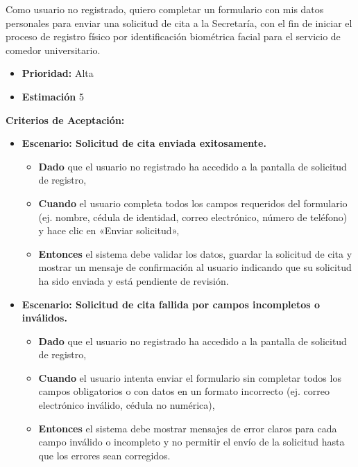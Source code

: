 \documentclass[12pt]{article}
\begin{document}
Como usuario no registrado, quiero completar un formulario con mis datos personales para enviar una solicitud de cita a la Secretaría, con el fin de iniciar el proceso de registro físico por identificación biométrica facial para el servicio de comedor universitario.

\begin{itemize}
	\item \textbf{Prioridad:} Alta
	\item \textbf{Estimación} 5
\end{itemize}

\textbf{Criterios de Aceptación:}
\begin{itemize}
	\item \textbf{Escenario: Solicitud de cita enviada exitosamente.}
	\begin{itemize}
		\item \textbf{Dado} que el usuario no registrado ha accedido a la pantalla de solicitud de registro,
		\item \textbf{Cuando} el usuario completa todos los campos requeridos del formulario (ej. nombre, cédula de identidad, correo electrónico, número de teléfono) y hace clic en «Enviar solicitud»,
		\item \textbf{Entonces} el sistema debe validar los datos, guardar la solicitud de cita y mostrar un mensaje de confirmación al usuario indicando que su solicitud ha sido enviada y está pendiente de revisión.
	\end{itemize}

	\item \textbf{Escenario: Solicitud de cita fallida por campos incompletos o inválidos.}
	\begin{itemize}
		\item \textbf{Dado} que el usuario no registrado ha accedido a la pantalla de solicitud de registro,
		\item \textbf{Cuando} el usuario intenta enviar el formulario sin completar todos los campos obligatorios o con datos en un formato incorrecto (ej. correo electrónico inválido, cédula no numérica),
		\item \textbf{Entonces} el sistema debe mostrar mensajes de error claros para cada campo inválido o incompleto y no permitir el envío de la solicitud hasta que los errores sean corregidos.
	\end{itemize}


\end{itemize}
\end{document}
